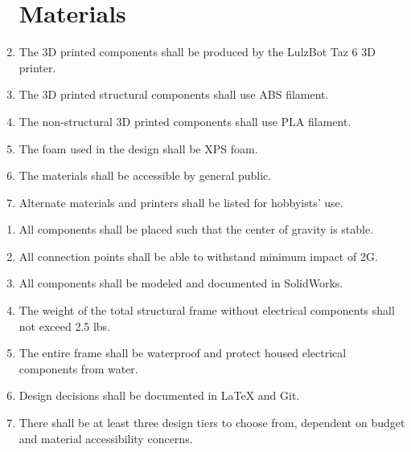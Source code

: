 \documentclass{article}
\begin{document}
	\begin{enumerate}
		
		\section{Materials}
		
		\item The 3D printed components shall be produced by the LulzBot Taz 6 3D printer.\\
		\item The 3D printed structural components shall use ABS filament.\\
		\item The non-structural 3D printed components shall use PLA filament.\\
		\item The foam used in the design shall be XPS foam.\\
		\item The materials shall be accessible by general public.\\
		\item Alternate materials and printers shall be listed for hobbyists' use.\\

	\end{enumerate}		

	\begin{enumerate}
		
		\section{General}
		
		\item All components shall be placed such that the center of gravity is stable.\\
		\item All connection points shall be able to withstand minimum impact of 2G.\\
		\item All components shall be modeled and documented in SolidWorks.\\
		\item The weight of the total structural frame without electrical components shall not exceed 2.5 lbs.\\
		\item The entire frame shall be waterproof and protect housed electrical components from water.\\
		\item Design decisions shall be documented in LaTeX and Git.\\
		\item There shall be at least three design tiers to choose from, dependent on budget and material accessibility concerns.\\

		
		
	\end{enumerate}
	
\end{document}
